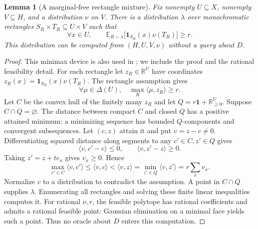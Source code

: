 \documentclass[11pt]{article}
\newtheorem{lemma}[theorem]{Lemma}
\newcommand{\R}{\mathbb R}
\newcommand{\E}{\mathbb E}
\newcommand{\1}{\mathbf 1}
\begin{document}
\begin{samepage}
\begin{lemma}[A marginal-free rectangle mixture]\label{lem:mixture}
Fix nonempty $U\subseteq X$, nonempty $V\subseteq H$, and a distribution $\nu$ on $V$. There is a distribution $\lambda$ over monochromatic rectangles $S_R\times T_R\subseteq U\times V$ such that
\begin{equation}\label{eq:coverage}
 \forall x\in U,\qquad
 \E_{R\sim\lambda}\bigl[\1_{S_R}(x)\nu(T_R)\bigr]\ge r.
\end{equation}
This distribution can be computed from $(H,U,V,\nu)$ without a query about $D$.
\end{lemma}
\end{samepage}
\begin{proof}
This minimax device is also used in \citet[Theorem~3.1]{HHPTZ22}; we include the proof and the rational feasibility detail. For each rectangle let $z_R\in\R^U$ have coordinates $z_R(x)=\1_{S_R}(x)\nu(T_R)$. The rectangle assumption gives
\[
 \forall\mu\in\Delta(U),\quad \max_R\langle\mu,z_R\rangle\ge r.
\]
Let $C$ be the convex hull of the finitely many $z_R$ and let $Q=r\1+\R_{\ge0}^U$. Suppose $C\cap Q=\varnothing$. The distance between compact $C$ and closed $Q$ has a positive attained minimum: a minimizing sequence has bounded $Q$-components and convergent subsequences. Let $(c,z)$ attain it and put $v=z-c\ne0$. Differentiating squared distance along segments to any $c'\in C,z'\in Q$ gives
\[
 \langle v,c'-c\rangle\le0,\qquad\langle v,z'-z\rangle\ge0.
\]
Taking $z'=z+te_x$ gives $v_x\ge0$. Hence
\[
 \max_{c'\in C}\langle v,c'\rangle
 \le\langle v,c\rangle<\langle v,z\rangle
 =\min_{z'\in Q}\langle v,z'\rangle=r\sum_xv_x.
\]
Normalize $v$ to a distribution to contradict the assumption. A point in $C\cap Q$ supplies $\lambda$. Enumerating all rectangles and solving these finite linear inequalities computes it. For rational $\nu,r$, the feasible polytope has rational coefficients and admits a rational feasible point: Gaussian elimination on a minimal face yields such a point. Thus no oracle about $D$ enters this computation.
\end{proof}
\end{document}
